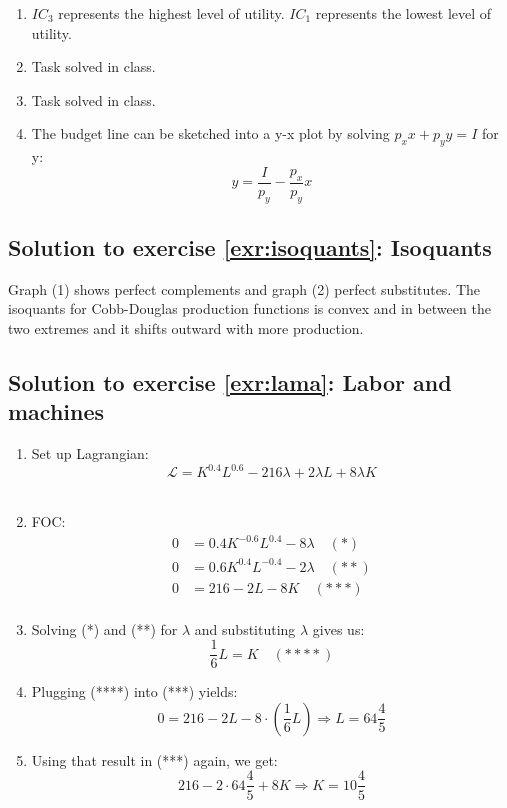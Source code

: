 \documentclass[
  12pt,
  oneside]{book}
\providecommand{\tightlist}{%
  \setlength{\itemsep}{0pt}\setlength{\parskip}{0pt}}
\theoremstyle{definition}
\theoremstyle{definition}
\theoremstyle{definition}
\theoremstyle{definition}
\theoremstyle{remark}
\begin{document}
\begin{enumerate}
\def\labelenumi{\alph{enumi})}
\tightlist
\item
  \(IC_3\) represents the highest level of utility. \(IC_1\) represents the lowest level of utility.\\
\item
  Task solved in class.
\item
  Task solved in class.
\item
  The budget line can be sketched into a y-x plot by solving \(p_xx+p_yy=I\) for y: \[y=\frac{I}{p_y}-\frac{p_x}{p_y}x\]
\end{enumerate}

\hypertarget{sol:isoquants}{%
\subsection*{Solution to exercise \ref{exr:isoquants}: Isoquants}\label{sol:isoquants}}

Graph (1) shows perfect complements and graph (2) perfect substitutes. The isoquants for Cobb-Douglas production functions is convex and in between the two extremes and it shifts outward with more production.

\hypertarget{sol:lama}{%
\subsection*{Solution to exercise \ref{exr:lama}: Labor and machines}\label{sol:lama}}

\begin{enumerate}
\def\labelenumi{\arabic{enumi}.}
\tightlist
\item
  Set up Lagrangian:
  \[\mathcal{L} = K^{0.4}L^{0.6} - 216\lambda + 2\lambda L + 8\lambda K\]\\
\item
  FOC:
  \begin{align*}
     0 &= 0.4K^{-0.6}L^{0.4} - 8\lambda \quad (*) \\
     0 &= 0.6K^{0.4}L^{-0.4} - 2\lambda \quad (**) \\
     0 &= 216 - 2L - 8K \quad (***) \\
  \end{align*}
\item
  Solving (*) and (**) for \(\lambda\) and substituting \(\lambda\) gives us:
  \[\frac{1}{6}L = K \quad (****)\]
\item
  Plugging (****) into (***) yields:
  \[0 = 216 - 2L - 8\cdot\left(\frac{1}{6}L\right) \Rightarrow L = 64\frac{4}{5}\]
\item
  Using that result in (***) again, we get:
  \[216 - 2\cdot 64\frac{4}{5} + 8K \Rightarrow K = 10\frac{4}{5}\]
\end{enumerate}
\end{document}
